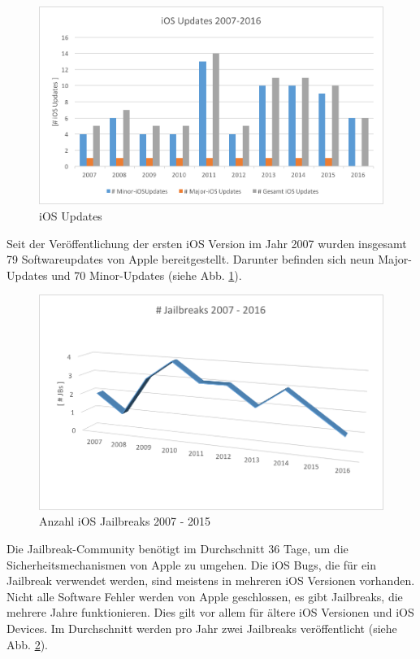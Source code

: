 \begin{figure}[ht!]
        \centering
                \includegraphics[scale=0.9]{Bilder/iOSUpdates1}
        \caption{iOS Updates \cite{Apple[7]} \protect\footnotemark}
        	\label{fig:iOS Software Updates}
\end{figure}
Seit der Veröffentlichung der ersten iOS Version im Jahr 2007 wurden insgesamt 79 Softwareupdates von Apple bereitgestellt. Darunter befinden sich neun Major-Updates und 70  Minor-Updates (siehe Abb. \ref{fig:iOS Software Updates}).\par 
\begin{figure}[hb!]
        \centering
                \includegraphics[scale=0.95]{Bilder/AnzahlJB}
        \caption{Anzahl iOS Jailbreaks 2007 - 2015 \protect\footnotemark}
        	\label{fig:iOS Jailbreak}
\end{figure}
Die Jailbreak-Community benötigt im Durchschnitt 36 Tage, um die Sicherheitsmechanismen von Apple zu umgehen. Die iOS Bugs, die für ein Jailbreak verwendet werden, sind meistens in mehreren iOS Versionen vorhanden. Nicht alle Software Fehler werden von Apple geschlossen, es gibt Jailbreaks, die mehrere Jahre funktionieren. Dies gilt vor allem für ältere iOS Versionen und iOS Devices. Im Durchschnitt werden pro Jahr zwei Jailbreaks veröffentlicht (siehe Abb. \ref{fig:iOS Jailbreak}).
